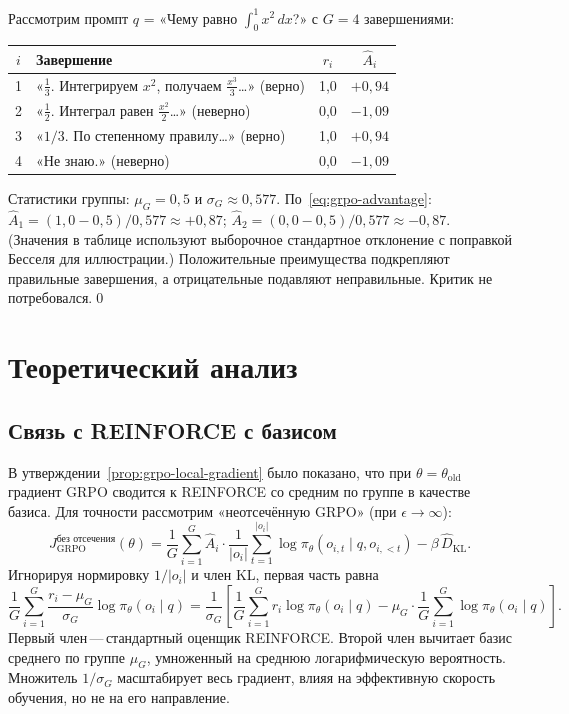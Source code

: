 \begin{example}
\label{ex:grpo-advantage}
Рассмотрим промпт $q$ = «Чему равно $\int_0^1 x^2\,dx$?» с $G = 4$ завершениями:
\begin{center}
{\footnotesize
\begin{tabular}{@{}clcc@{}}
\toprule
$i$ & Завершение & $r_i$ & $\hat{A}_i$ \\
\midrule
1 & «$\frac{1}{3}$. Интегрируем $x^2$, получаем $\frac{x^3}{3}$\ldots» (верно) & 1,0 & $+0{,}94$ \\
2 & «$\frac{1}{2}$. Интеграл равен $\frac{x^2}{2}$\ldots» (неверно) & 0,0 & $-1{,}09$ \\
3 & «$1/3$. По степенному правилу\ldots» (верно) & 1,0 & $+0{,}94$ \\
4 & «Не знаю.» (неверно) & 0,0 & $-1{,}09$ \\
\bottomrule
\end{tabular}
}
\end{center}
Статистики группы: $\mu_G = 0{,}5$ и $\sigma_G \approx 0{,}577$. По~\eqref{eq:grpo-advantage}: $\hat{A}_1 = (1{,}0 - 0{,}5)/0{,}577 \approx +0{,}87$; $\hat{A}_2 = (0{,}0 - 0{,}5)/0{,}577 \approx -0{,}87$. (Значения в таблице используют выборочное стандартное отклонение с поправкой Бесселя для иллюстрации.) Положительные преимущества подкрепляют правильные завершения, а отрицательные подавляют неправильные. Критик не потребовался.\qed
\end{example}

\section{Теоретический анализ}
\label{sec:grpo-theory}

\subsection{Связь с REINFORCE с базисом}

В утверждении~\ref{prop:grpo-local-gradient} было показано, что при $\theta = \theta_\mathrm{old}$ градиент GRPO сводится к REINFORCE со средним по группе в качестве базиса. Для точности рассмотрим «неотсечённую GRPO» (при $\epsilon \to \infty$):
\begin{equation}
\label{eq:grpo-unclipped}
J_{\mathrm{GRPO}}^{\mbox{без отсечения}}(\theta) = \frac{1}{G}\sum_{i=1}^G \hat{A}_i \cdot \frac{1}{|o_i|}\sum_{t=1}^{|o_i|} \log \pi_\theta(o_{i,t} \mid q, o_{i,<t}) - \beta\, \hat{D}_\mathrm{KL}.
\end{equation}
Игнорируя нормировку $1/|o_i|$ и член KL, первая часть равна
\[
\frac{1}{G}\sum_{i=1}^G \frac{r_i - \mu_G}{\sigma_G} \log \pi_\theta(o_i \mid q)
= \frac{1}{\sigma_G}\left[\frac{1}{G}\sum_{i=1}^G r_i \log \pi_\theta(o_i \mid q) - \mu_G \cdot \frac{1}{G}\sum_{i=1}^G \log \pi_\theta(o_i \mid q)\right].
\]
Первый член\,---\,стандартный оценщик REINFORCE. Второй член вычитает базис среднего по группе $\mu_G$, умноженный на среднюю логарифмическую вероятность. Множитель $1/\sigma_G$ масштабирует весь градиент, влияя на эффективную скорость обучения, но не на его направление.

